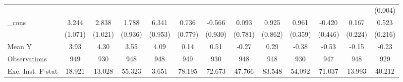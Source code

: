 {\begin{tabular}{l*{12}{c}}
            &                     &                     &                     &                     &                     &                     &                     &                     &                     &                     &                     &     (0.004)         \\
\addlinespace
\_cons      &       3.244\sym{***}&       2.838\sym{***}&       1.788\sym{*}  &       6.341\sym{***}&       0.736         &      -0.566         &       0.093         &       0.925         &       0.961\sym{**} &      -0.420         &       0.167         &       0.523\sym{**} \\
            &     (1.071)         &     (1.021)         &     (0.936)         &     (0.953)         &     (0.779)         &     (0.930)         &     (0.781)         &     (0.862)         &     (0.359)         &     (0.446)         &     (0.224)         &     (0.216)         \\
\midrule
Mean Y      &        3.93         &        4.30         &        3.55         &        4.09         &        0.14         &        0.51         &       -0.27         &        0.29         &       -0.38         &       -0.53         &       -0.15         &       -0.23         \\
Observations&         949         &         930         &         948         &         948         &         949         &         930         &         948         &         948         &         930         &         947         &         948         &         929         \\
Exc. Inst. F-stat&      18.921         &      13.028         &      55.323         &       3.651         &      78.195         &      72.673         &      47.766         &      83.548         &      54.092         &      71.037         &      13.993         &      40.212         \\
\bottomrule
\end{tabular}
}
